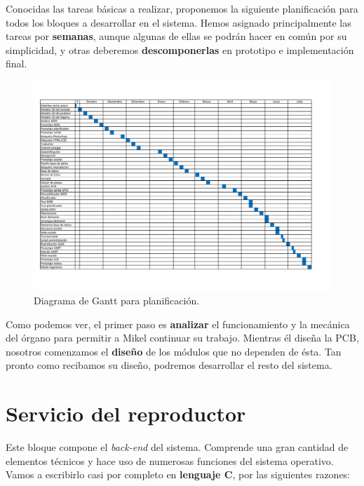 Conocidas las tareas básicas a realizar, proponemos la siguiente planificación para todos los bloques a desarrollar en el sistema. Hemos asignado principalmente las tareas por \textbf{semanas}, aunque algunas de ellas se podrán hacer en común por su simplicidad, y otras deberemos \textbf{descomponerlas} en prototipo e implementación final.

\smallskip

\begin{figure}[H]
	\noindent \begin{centering}
		\includegraphics[clip=true,trim=20 50 50 50,width=\linewidth]{capitulo5/gantt}
		\par\end{centering}
	\smallskip
	\caption{\label{fig:gantt} Diagrama de Gantt para planificación.}
\end{figure} 

\smallskip

Como podemos ver, el primer paso es \textbf{analizar} el funcionamiento y la mecánica del órgano para permitir a Mikel continuar su trabajo. Mientras él diseña la \acrshort{PCB}, nosotros comenzamos el \textbf{diseño} de los módulos que no dependen de ésta. Tan pronto como recibamos su diseño, podremos desarrollar el resto del sistema.

\newpage

\section{Servicio del reproductor}

Este bloque compone el \textit{back-end} del sistema. Comprende una gran cantidad de elementos técnicos y hace uso de numerosas funciones del sistema operativo. Vamos a escribirlo casi por completo en \textbf{lenguaje C}, por las siguientes razones:

